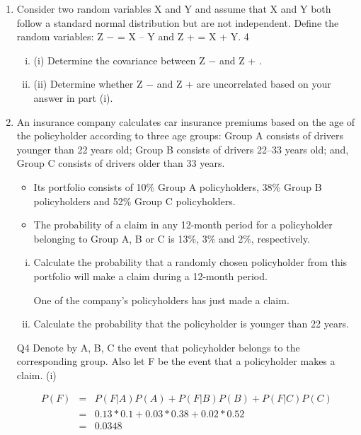 \documentclass[a4paper,12pt]{article}
\begin{document}
\begin{enumerate}
\item Consider two random variables X and Y and assume that X and Y both follow a standard normal distribution but are not independent. Define the random variables:
Z − = X – Y and Z + = X + Y.
4
\begin{enumerate}[(i)]
\item (i) Determine the covariance between Z − and Z + .
\item (ii) Determine whether Z − and Z + are uncorrelated based on your answer in part (i).
\end{enumerate}


\item An insurance company calculates car insurance premiums based on the age of the policyholder according to three age groups: Group A consists of drivers younger than 22 years old; Group B consists of drivers 22–33 years old; and, Group C consists of
drivers older than 33 years.

\begin{itemize}
\item Its portfolio consists of 10\% Group A policyholders, 38\% Group B policyholders and 52\% Group C policyholders.
\item 
The probability of a claim in any 12-month period for a policyholder belonging to Group A, B or C is 13\%, 3\% and 2\%, respectively.
\end{itemize}

\begin{enumerate}[(i)]
\item %
Calculate the probability that a randomly chosen policyholder from this
portfolio will make a claim during a 12-month period.

One of the company’s policyholders has just made a claim.
\item %
Calculate the probability that the policyholder is younger than 22 years.
\end{enumerate}
Q4
Denote by A, B, C the event that policyholder belongs to the corresponding group.
Also let F be the event that a policyholder makes a claim.
(i)

\begin{eqnarray*}
P(F) &=& P(F|A)P(A) + P(F|B)P(B) + P(F|C)P(C)\\
&=& 0.13*0.1 + 0.03*0.38 + 0.02*0.52 \\
&=& 0.0348\\
\end{eqnarray*}


\end{enumerate}
\end{document}
